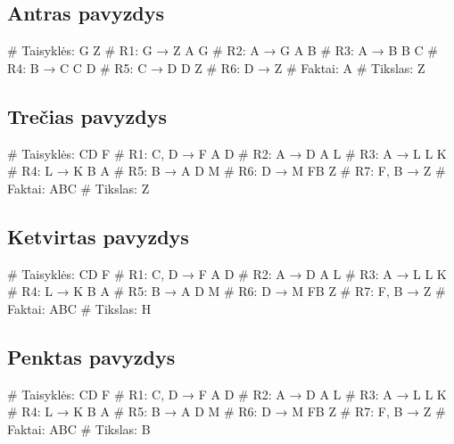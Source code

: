 \subsection{Antras pavyzdys}

\begin{pythonaienv}[fc]
# Taisyklės:
G Z                                     # R1: G → Z
A G                                     # R2: A → G
A B                                     # R3: A → B
B C                                     # R4: B → C
C D                                     # R5: C → D
D Z                                     # R6: D → Z
# Faktai:
A
# Tikslas:
Z
\end{pythonaienv}

\subsection{Trečias pavyzdys}

\begin{pythonaienv}[fc]
# Taisyklės:
CD F                                    # R1: C, D → F
A D                                     # R2: A → D
A L                                     # R3: A → L
L K                                     # R4: L → K
B A                                     # R5: B → A
D M                                     # R6: D → M
FB Z                                    # R7: F, B → Z
# Faktai:
ABC
# Tikslas:
Z
\end{pythonaienv}

\subsection{Ketvirtas pavyzdys}

\begin{pythonaienv}[fc]
# Taisyklės:
CD F                                    # R1: C, D → F
A D                                     # R2: A → D
A L                                     # R3: A → L
L K                                     # R4: L → K
B A                                     # R5: B → A
D M                                     # R6: D → M
FB Z                                    # R7: F, B → Z
# Faktai:
ABC
# Tikslas:
H
\end{pythonaienv}

\subsection{Penktas pavyzdys}

\begin{pythonaienv}[fc]
# Taisyklės:
CD F                                    # R1: C, D → F
A D                                     # R2: A → D
A L                                     # R3: A → L
L K                                     # R4: L → K
B A                                     # R5: B → A
D M                                     # R6: D → M
FB Z                                    # R7: F, B → Z
# Faktai:
ABC
# Tikslas:
B
\end{pythonaienv}

